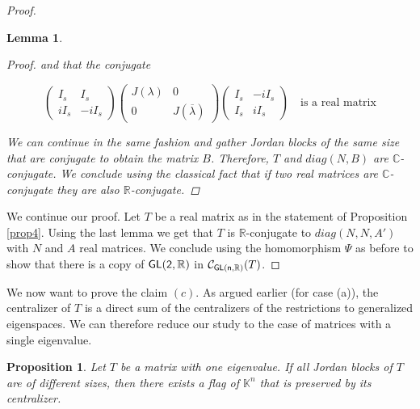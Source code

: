 \documentclass[a4paper,11pt]{article}
\newtheorem{lemma}{Lemma}[section]
\newtheorem{proposition}{Proposition}[section]
\theoremstyle{definition}
\newcommand{\C}{\mathcal C}
\newcommand{\R}{\mathbb R}
\newcommand{\K}{\mathbb K}
\def \GL{\sf{GL}}
\begin{document}
\begin{proof}
\begin{lemma}
\begin{proof}
and that the conjugate

$$\begin{pmatrix}
I_s & I_s \\
iI_s & -iI_s  
\end{pmatrix}
\begin{pmatrix}
J(\lambda) & 0 \\
0 & J(\overline{\lambda})  
\end{pmatrix}
\begin{pmatrix}
I_s & -iI_s \\
I_s & iI_s  
\end{pmatrix} \quad \text{is a real matrix}$$

We can continue in the same fashion and gather Jordan blocks of the same size that are conjugate to obtain the matrix $B$. Therefore, $T$ and $diag(N,B)$ are $\mathbb{C}$-conjugate. We conclude using the classical fact that if two real matrices are $\mathbb{C}$-conjugate they are also $\R$-conjugate.

\end{proof}
    
\end{lemma}


We continue our proof. Let $T$ be a real matrix as in the statement of Proposition \ref{prop4}.  Using the last lemma we get that $T$ is $\R$-conjugate to $diag(N,N,A')$ with $N$ and $A$ real matrices. We conclude using the homomorphism $\Psi$ as before to show that there is a copy of $\GL(2,\R)$ in $\C_{\GL(n,\R)}(T)$.

\end{proof}                                   

 We now want to prove the claim $(c)$. As argued earlier (for case (a)), the centralizer of $T$ is a direct sum of the centralizers of the restrictions to generalized eigenspaces. We can therefore reduce our study to the case of matrices with a single eigenvalue.

\begin{proposition}\label{prop6}
    Let $T$ be a matrix with one eigenvalue. If all Jordan blocks of $T$ are of different sizes, then there exists a flag  of $\K^n$ that is preserved by its centralizer.
    
\end{proposition}
\end{document}
